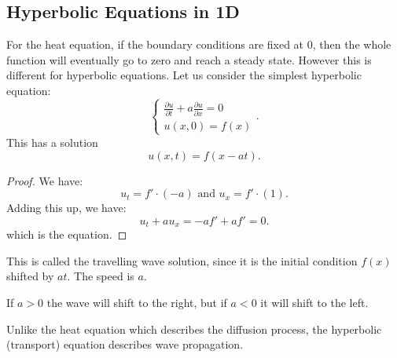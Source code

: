 \documentclass[../main/main.tex]{subfiles}
\begin{document}
\subsection{Hyperbolic Equations in 1D}
For the heat equation, if the boundary conditions are fixed at 0, then the whole function will eventually go to zero and reach a steady state. However this is different for hyperbolic equations. Let us consider the simplest hyperbolic equation: \[
\begin{cases}
    \frac{\partial u}{\partial t} + a \frac{\partial u}{\partial x} =0 \\
    u(x,0) = f(x)
\end{cases}
.\] This has a solution \[
u(x,t) = f(x-at)
.\] 
\begin{proof}We have:
    \[
        u_t = f' \cdot  (-a) \text{ and }u_x = f' \cdot  (1)
.\] Adding this up, we have: \[
u_t + a u_x = -af' + af' = 0
.\] which is the equation.
\end{proof}
\begin{remark}
    This is called the travelling wave solution, since it is the initial condition $f(x)$ shifted by  $at$. The speed is  $a$.
\end{remark}

\begin{remark}
    If $a>0$ the wave will shift to the right, but if  $a<0$ it will shift to the left.
\end{remark}
Unlike the heat equation which describes the diffusion process, the hyperbolic (transport) equation describes wave propagation.
\end{document}
